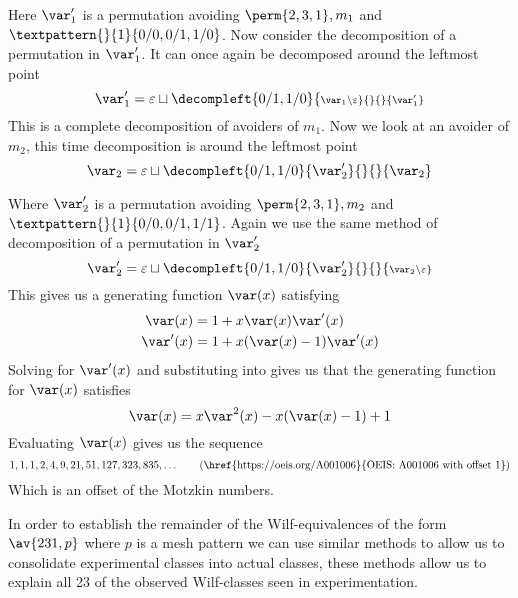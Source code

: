 \noindent
Here \(\scriptvar^\prime_1\) is a permutation avoiding \(\perm{2,3,1}, m_1\)
and \(\textpattern{}{1}{0/0,0/1,1/0}\).
Now consider the decomposition of a permutation in \(\scriptvar^\prime_1\). It can
once again be decomposed around the leftmost point
\begin{equation*}
    \scriptvar^\prime_1 = \varepsilon \sqcup
    \decompleft{0/1,1/0}{\scriptstyle \scriptvar_1\setminus\varepsilon}{}{}{\scriptvar^\prime_1}
\end{equation*}
This is a complete decomposition of avoiders of \(m_1\). Now we
look at an avoider of \(m_2\), this time decomposition is around the leftmost point
\begin{equation*}
    \scriptvar_2 = \varepsilon \sqcup
    \decompleft{0/1,1/0}{\scriptvar^\prime_2}{}{}{\scriptvar_2}
\end{equation*}

Where \(\scriptvar^\prime_2\) is a permutation avoiding \(\perm{2,3,1}, m_2\)
and \(\textpattern{}{1}{0/0,0/1,1/1}\).
Again we use the same method of decomposition of a permutation in \(\scriptvar^\prime_2\)
\begin{equation*}
    \scriptvar^\prime_2 = \varepsilon \sqcup
    \decompleft{0/1,1/0}{\scriptvar^\prime_2}{}{}{\scriptstyle \scriptvar_2\setminus\varepsilon}
\end{equation*}
This gives us a generating function \(\var(x)\) satisfying
\begin{align}
    \var(x) &= 1 + x\var(x)\var^\prime(x) \label{eqn:Pgen}\\
    \var^\prime(x) &= 1 + x(\var(x)-1)\var^\prime(x)\label{eqn:PprimeGen}
\end{align}
Solving  for \(\var^\prime(x)\) and substituting into
 gives us that the generating function for
\(\var(x)\) satisfies
\begin{equation}
    \var(x) = x\var^2(x) - x(\var(x) - 1) + 1
\end{equation}
Evaluating \(\var(x)\) gives us the sequence
\begin{equation*}
    1, 1, 1, 2, 4, 9, 21, 51, 127, 323, 835,\dotsc \tag{\href{https://oeis.org/A001006}{OEIS: A001006 with offset 1}}
\end{equation*}
Which is an offset of the Motzkin numbers.

In order to establish the remainder of the Wilf-equivalences of the form \(\av{231,p}\) where \(p\)
is a mesh pattern we can use similar methods to allow us to consolidate experimental classes into
actual classes, these methods allow us to explain all 23 of the observed Wilf-classes seen in experimentation.
